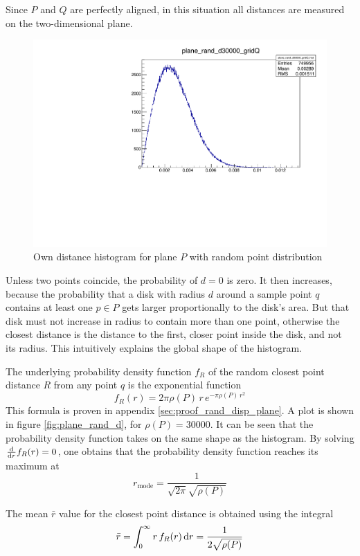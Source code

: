 Since $P$ and $Q$ are perfectly aligned, in this situation all distances are measured on the two-dimensional plane.

\begin{figure}[H]
\centering
\includegraphics[width=.4\textwidth]{fig/plane_rand_d30000_gridQ.pdf}
\caption{Own distance histogram for plane $P$ with random point distribution}
\label{fig:plane_rand_d30000}
\end{figure}

Unless two points coincide, the probability of $d = 0$ is zero. It then increases, because the probability that a disk with radius $d$ around a sample point $q$ contains at least one $p \in P$ gets larger proportionally to the disk's area. But that disk must not increase in radius to contain more than one point, otherwise the closest distance is the distance to the first, closer point inside the disk, and not its radius. This intuitively explains the global shape of the histogram.

The underlying probability density function $f_R$ of the random closest point distance $R$ from any point $q$ is the exponential function
\begin{equation}
f_R(r) = 2 \pi \rho(P) \, r \, e^{-\pi \rho(P) \, r^2}
\end{equation}
This formula is proven in appendix \ref{sec:proof_rand_disp_plane}. A plot is shown in figure \ref{fig:plane_rand_d}, for $\rho(P) = 30000$. It can be seen that the probability density function takes on the same shape as the histogram. By solving $\frac{\mathrm{d}}{\mathrm{d} r} f_R(r) = 0$, one obtains that the probability density function reaches its maximum at
\begin{equation}
r_{\text{mode}} = \frac{1}{\sqrt{2 \pi} \sqrt{\rho(P)}}
\end{equation}

The mean $\bar{r}$ value for the closest point distance is obtained using the integral
\begin{equation}
\bar{r} = \int_{0}^{\infty} r \, f_R(r) \, \mathrm{d} r = \frac{1}{2 \sqrt{\rho(P)}}
\end{equation}

